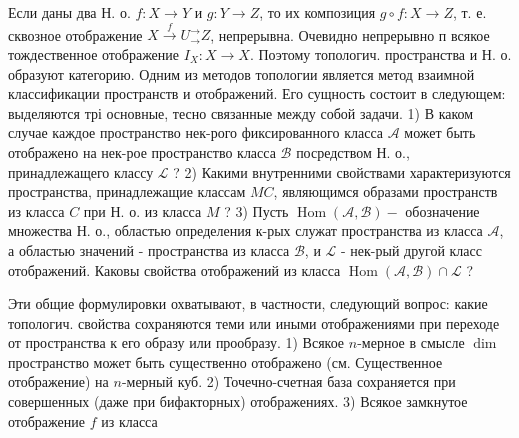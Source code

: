 \documentclass[10pt]{article}
\begin{document}
Если даны два Н. о. $f: X \rightarrow Y$ и $g: Y \rightarrow Z$, то их композиция $g \circ f: X \rightarrow Z$, т. е. сквозное отображение $X \stackrel{f}{\rightarrow} U_{\rightarrow}^{\rightarrow} Z$, непрерывна. Очевидно непрерывно п всякое тождественное отображение $I_{X}: X \rightarrow X$. Поэтому топологич. пространства и Н. о. образуют категорию. Одним из методов топологии является метод взаимной классификации пространств и отображений. Его сущность состоит в следующем: выделяются трі основные, тесно связанные между собой задачи. 1) В каком случае каждое пространство нек-рого фиксированного класса $\mathcal{A}$ может быть отображено на нек-рое пространство класса $\mathscr{B}$ посредством Н. о., принадлежащего классу $\mathscr{L}$ ? 2) Какими внутренними свойствами характеризуются пространства, принадлежащие классам $M C$, являющимся образами пространств из класса $C$ при Н. о. из класса $M$ ? 3) Пусть $\operatorname{Hom}(\mathcal{A}, \mathscr{B})-$ обозначение множества Н. о., областью определения к-рых служат пространства из класса $\mathcal{A}$, а областью значений - пространства из класса $\mathscr{B}$, и $\mathscr{L}$ - нек-рый другой класс отображений. Каковы свойства отображений из класса $\operatorname{Hom}(\mathcal{A}, \mathscr{B}) \cap \mathscr{L}$ ?



Эти общие формулировки охватывают, в частности, следующий вопрос: какие топологич. свойства сохраняются теми или иными отображениями при переходе от пространства к его образу или прообразу. 1) Всякое $n$-мерное в смысле $\operatorname{dim}$ пространство может быть существенно отображено (см. Существенное отображение) на $n$-мерный куб. 2) Точечно-счетная база сохраняется при совершенных (даже при бифакторных) отображениях. 3) Всякое замкнутое отображение $f$ из класса
\end{document}
